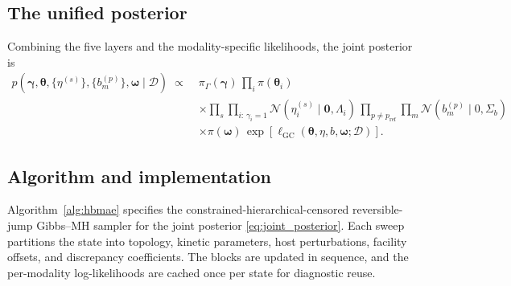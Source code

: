 \documentclass[12pt]{article}
\theoremstyle{plain}
\theoremstyle{definition}
\theoremstyle{remark}
\begin{document}
\subsection{The unified posterior}\label{sec:framework:posterior}

Combining the five layers and the modality-specific likelihoods, the joint
posterior is
%
\begin{equation}
\begin{split}
  p(\boldsymbol\gamma, \boldsymbol\theta, \{\eta^{(s)}\}, \{b^{(p)}_m\},
    \boldsymbol\omega \mid \mathcal{D})
  \;\propto\; & \pi_\Gamma(\boldsymbol\gamma)\,
                 \prod_{i} \pi(\boldsymbol\theta_i) \\
              & \times \prod_{s} \prod_{i:\,\gamma_i = 1} \mathcal{N}(\eta_i^{(s)} \mid \mathbf{0}, \Lambda_i)\,
                 \prod_{p\ne p_{\mathrm{ref}}} \prod_m \mathcal{N}(b^{(p)}_m \mid 0, \Sigma_b) \\
              & \times \pi(\boldsymbol\omega)\,
                 \exp\!\left[\ell_{\mathrm{GC}}(\boldsymbol\theta,\eta,b,\boldsymbol\omega;\mathcal{D})\right].
\end{split}
\label{eq:joint_posterior}
\end{equation}

\subsection{Algorithm and implementation}\label{sec:framework:algorithm}

Algorithm~\ref{alg:hbmae} specifies the constrained-hierarchical-censored
reversible-jump Gibbs--MH sampler for the joint posterior
\eqref{eq:joint_posterior}.  Each sweep partitions the state into topology,
kinetic parameters, host perturbations, facility offsets, and discrepancy
coefficients.  The blocks are updated in sequence, and the per-modality
log-likelihoods are cached once per state for diagnostic reuse.
\end{document}
